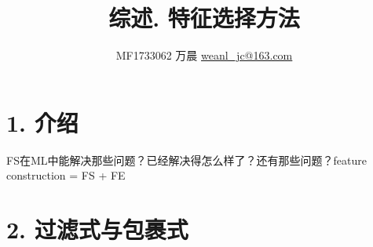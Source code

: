 \documentclass[a4paper,UTF8]{article}
\begin{document}
\title{综述. 特征选择方法}
\author{MF1733062 万晨 \url{weanl_jc@163.com}}
\maketitle

\section*{1. 介绍}
  FS在ML中能解决那些问题？已经解决得怎么样了？还有那些问题？feature construction = FS + FE





\section*{2. 过滤式与包裹式}
\end{document}
